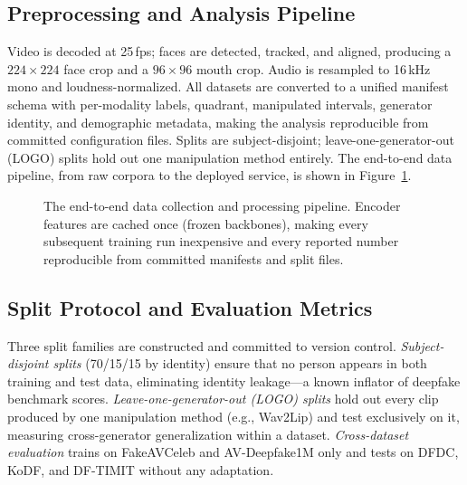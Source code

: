 \subsection{Preprocessing and Analysis Pipeline}
Video is decoded at 25\,fps; faces are detected, tracked, and aligned,
producing a $224\times224$ face crop and a $96\times96$ mouth crop. Audio is
resampled to 16\,kHz mono and loudness-normalized. All datasets are converted
to a unified manifest schema with per-modality labels, quadrant, manipulated
intervals, generator identity, and demographic metadata, making the analysis
reproducible from committed configuration files. Splits are subject-disjoint;
leave-one-generator-out (LOGO) splits hold out one manipulation method
entirely. The end-to-end data pipeline, from raw corpora to the deployed
service, is shown in Figure~\ref{fig:pipeline}.

\begin{figure}[htbp]
  \centering
  
  \caption{The end-to-end data collection and processing pipeline. Encoder
  features are cached once (frozen backbones), making every subsequent
  training run inexpensive and every reported number reproducible from
  committed manifests and split files.}
  \label{fig:pipeline}
\end{figure}

\subsection{Split Protocol and Evaluation Metrics}
\label{sec:metrics}

Three split families are constructed and committed to version control.
\emph{Subject-disjoint splits} (70/15/15 by identity) ensure that no person
appears in both training and test data, eliminating identity leakage---a
known inflator of deepfake benchmark scores. \emph{Leave-one-generator-out
(LOGO) splits} hold out every clip produced by one manipulation method
(e.g., Wav2Lip) and test exclusively on it, measuring cross-generator
generalization within a dataset. \emph{Cross-dataset evaluation} trains on
FakeAVCeleb and AV-Deepfake1M only and tests on DFDC, KoDF, and DF-TIMIT
without any adaptation.

